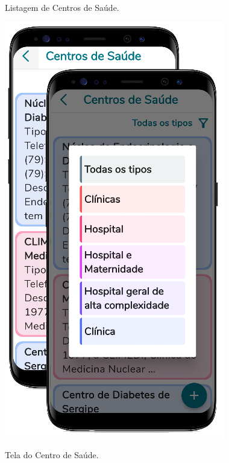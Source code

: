 \begin{figure}[htb]
    \centering
    \begin{minipage}{0.5\textwidth}
        \centering
        \caption{Listagem de Centros de Saúde.}\label{fig_list_centros}
        \includegraphics[scale=0.6]{Imagens/desenvolvimento/app/list_centros.png}
    \end{minipage}
    \hfill
    \begin{minipage}{0.45\textwidth}
        \centering
        \caption{Tela do Centro de Saúde.}\label{fig_page_centro}

\end{minipage}
\end{figure}

